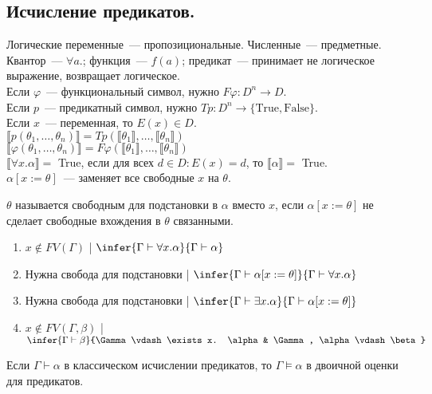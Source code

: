 \documentclass[12pt]{article}
\begin{document}
	\subsection{Исчисление предикатов.}
	Логические переменные~--- пропозициональные. Численные~--- предметные. \\
	Квантор~--- $\forall a.$; функция~--- $f(a)$; предикат~--- принимает не логическое выражение, возвращает логическое. \\
	Если $\varphi$~--- функциональный символ, нужно $F\varphi: D^n \rightarrow D$. \\
	Если $p$~--- предикатный символ, нужно $Tp: D^n \rightarrow \{ \text{True}, \text{False} \}$. \\
	Если $x$~--- переменная, то $E(x) \in D$. \\
	$\llbracket p(\theta_1, \dots, \theta_n) \rrbracket = Tp(\llbracket \theta_1 \rrbracket, \dots, \llbracket \theta_n \rrbracket)$ \\
	$\llbracket \varphi (\theta_1, \dots, \theta_n) \rrbracket = F\varphi(\llbracket \theta_1 \rrbracket, \dots, \llbracket \theta_n \rrbracket)$ \\
	$\llbracket \forall x. \alpha \rrbracket =$ True, если для всех $d \in D: E(x) = d$, то $\llbracket \alpha \rrbracket =$ True. \\
	$\alpha [ x := \theta ]$~--- заменяет все свободные $x$ на $\theta$.
	\begin{definition}
		$\theta$ называется свободным для подстановки в $\alpha$ вместо $x$, если $\alpha [x := \theta]$ не сделает свободные вхождения в $\theta$ связанными.
	\end{definition}
	\begin{enumerate}
		\item $x \not\in FV(\Gamma)$ | $\infer{\Gamma \vdash \forall x. \alpha}{\Gamma \vdash \alpha}$
		\item Нужна свобода для подстановки | $\infer{\Gamma \vdash \alpha [x := \theta]}{\Gamma \vdash \forall x. \alpha}$
		\item Нужна свобода для подстановки | $\infer{\Gamma \vdash \exists x. \alpha}{\Gamma \vdash \alpha [x := \theta]}$
		\item $x \not\in FV(\Gamma, \beta)$ | $\infer{\Gamma \vdash \beta}{\Gamma \vdash \exists x. \alpha & \Gamma, \alpha \vdash \beta}$
	\end{enumerate}
	\begin{theorem}
		Если $\Gamma \vdash \alpha$ в классическом исчислении предикатов, то $\Gamma \vDash \alpha$ в двоичной оценки для предикатов.
	\end{theorem}
\end{document}
